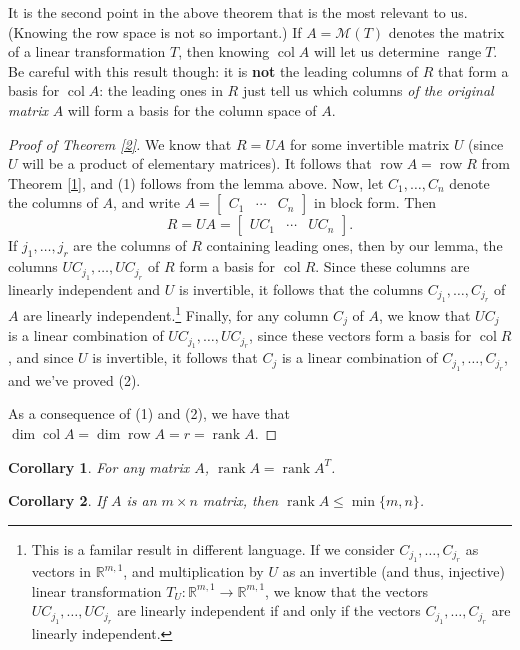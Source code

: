 \documentclass[letterpaper,12pt]{article}
\newtheorem{corollary}{Corollary}
\newcommand{\R}{\mathbb{R}}
\DeclareMathOperator{\range}{range}
\DeclareMathOperator{\col}{col}
\DeclareMathOperator{\row}{row}
\DeclareMathOperator{\rank}{rank}
\begin{document}
 It is the second point in the above theorem that is the most relevant to us. (Knowing the row space is not so important.) If $A=\mathcal{M}(T)$ denotes the matrix of a linear transformation $T$, then knowing $\col A$ will let us determine $\range T$. Be careful with this result though: it is {\bf not} the leading columns of $R$ that form a basis for $\col A$: the leading ones in $R$ just tell us which columns {\em of the original matrix} $A$ will form a basis for the column space of $A$.

\begin{proof}[Proof of Theorem \ref{2}]
 We know that $R=UA$ for some invertible matrix $U$ (since $U$ will be a product of elementary matrices). It follows that $\row A = \row R$ from Theorem \ref{1}, and (1) follows from the lemma above. Now, let $C_1,\ldots, C_n$ denote the columns of $A$, and write $A=\begin{bmatrix}C_1&\cdots &C_n\end{bmatrix}$ in block form. Then
\[
 R = UA =\begin{bmatrix}UC_1&\cdots &UC_n\end{bmatrix}.
\]
If $j_1,\ldots, j_r$ are the columns of $R$ containing leading ones, then by our lemma, the columns $UC_{j_1},\ldots, UC_{j_r}$ of $R$ form a basis for $\col R$. Since these columns are linearly independent and $U$ is invertible, it follows that the columns $C_{j_1},\ldots, C_{j_r}$ of $A$ are linearly independent.\footnote{This is a familar result in different language. If we consider $C_{j_1},\ldots, C_{j_r}$ as vectors in $\R^{m,1}$, and multiplication by $U$ as an invertible (and thus, injective) linear transformation $T_U:\R^{m,1}\to \R^{m,1}$, we know that the vectors $UC_{j_1},\ldots, UC_{j_r}$ are linearly independent if and only if the vectors $C_{j_1},\ldots, C_{j_r}$ are linearly independent.} Finally, for any column $C_j$ of $A$, we know that $UC_j$ is a linear combination of $UC_{j_1},\ldots, UC_{j_r}$, since these vectors form a basis for $\col R$, and since $U$ is invertible, it follows that $C_j$ is a linear combination of $C_{j_1},\ldots, C_{j_r}$, and we've proved (2).

As a consequence of (1) and (2), we have that $\dim \col A = \dim \row A = r= \rank A$.
\end{proof}
\begin{corollary}
 For any matrix $A$, $\rank A = \rank A^T$.
\end{corollary}
\begin{corollary}
 If $A$ is an $m\times n$ matrix, then $\rank A\leq \min\{m,n\}$.
\end{corollary}
\end{document}
